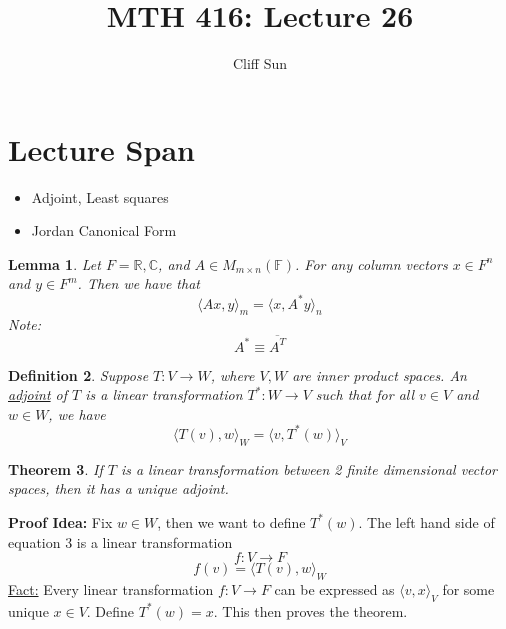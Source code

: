 \documentclass{article}
\title{MTH 416: Lecture 26}
\author{Cliff Sun}
\newtheorem{theorem}{Theorem}[section]
\newtheorem{lemma}[theorem]{Lemma}
\newtheorem{definition}[theorem]{Definition}
\newtheorem{one minute paper}[theorem]{One Minute Paper}
\begin{document}
\maketitle

\section*{Lecture Span}
\begin{itemize}
    \item Adjoint, Least squares 
    \item Jordan Canonical Form
\end{itemize}

\begin{lemma}
    Let $F = \mathbb{R}, \mathbb{C}$, and $A \in M_{m \times n}(\mathbb{F})$. For any column vectors $x \in F^n$ and $y \in F^m$. Then we have that 
    \begin{equation}
        \langle Ax, y \rangle_m = \langle x, A^* y\rangle_n
    \end{equation}
    Note: 
    \begin{equation}
        A^* \equiv \overline{A^T}
    \end{equation}
\end{lemma}

\begin{definition}
    Suppose $T: V \rightarrow W$, where $V, W$ are inner product spaces. An \underline{adjoint} of $T$ is a linear transformation 
    $T^*: W \rightarrow V$ such that for all $v \in V$ and $w \in W$, we have 
    \begin{equation}
        \langle T(v), w \rangle_W = \langle v, T^*(w) \rangle_V
    \end{equation} 
\end{definition}

\begin{theorem}
    If $T$ is a linear transformation between 2 finite dimensional vector spaces, then it has a unique adjoint. 
\end{theorem}

\textbf{Proof Idea:} Fix $w \in W$, then we want to define $T^*(w)$. The left hand side of equation 3 is a linear transformation 
\begin{equation}
    f: V \rightarrow F
\end{equation}
\begin{equation}
    f(v) = \langle T(v), w \rangle_W
\end{equation}
\underline{Fact:} Every linear transformation $f: V \rightarrow F$ can be expressed as $\langle v, x \rangle_V$ for some unique $x \in V$. Define $T^*(w) = x$.
This then proves the theorem.  
\end{document}
